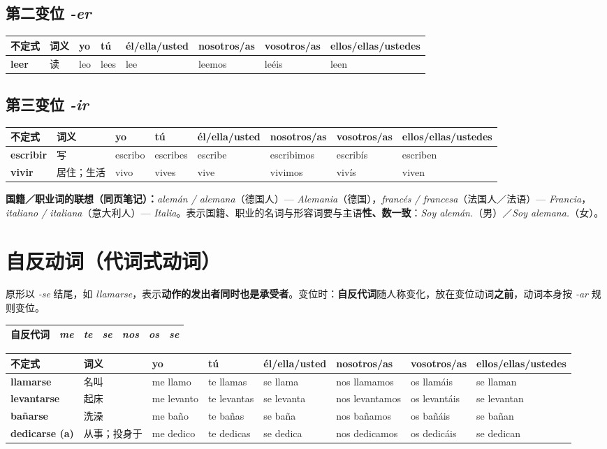 \documentclass[a4paper,11pt]{ctexart}
\makeatletter
\newcommand{\es}[1]{\textit{#1}}
\newcommand{\conj}[8]{\textbf{#1} & {\small #2} & #3 & #4 & #5 & #6 & #7 & #8 \\}
\newenvironment{conjtable}{%
  \par\small\setlength{\tabcolsep}{3.5pt}
  \begin{tabular}{@{}>{\raggedright\arraybackslash}p{1.95cm}>{\raggedright\arraybackslash}p{1.6cm}%
    >{\raggedright\arraybackslash}p{1.75cm}>{\raggedright\arraybackslash}p{1.75cm}>{\raggedright\arraybackslash}p{1.95cm}%
    >{\raggedright\arraybackslash}p{2.15cm}>{\raggedright\arraybackslash}p{1.95cm}>{\raggedright\arraybackslash}p{2.1cm}@{}}
  \toprule
  \textbf{不定式} & \textbf{词义} & \textbf{yo} & \textbf{tú} & \textbf{él/ella/\newline usted} & \textbf{nosotros/as} & \textbf{vosotros/as} & \textbf{ellos/ellas/\newline ustedes} \\
  \midrule
}{%
  \bottomrule\end{tabular}\par\normalsize
}
\makeatother
\begin{document}
\subsection{第二变位 \es{-er}}

\begin{conjtable}
\conj{leer}{读}{leo}{lees}{lee}{leemos}{leéis}{leen}
\end{conjtable}

\subsection{第三变位 \es{-ir}}

\begin{conjtable}
\conj{escribir}{写}{escribo}{escribes}{escribe}{escribimos}{escribís}{escriben}
\conj{vivir}{居住；生活}{vivo}{vives}{vive}{vivimos}{vivís}{viven}
\end{conjtable}

\begin{tip}
\textbf{国籍／职业词的联想（同页笔记）：}\es{alemán / alemana}（德国人）— \es{Alemania}（德国），\es{francés / francesa}（法国人／法语）— \es{Francia}，\es{italiano / italiana}（意大利人）— \es{Italia}。表示国籍、职业的名词与形容词要与主语\textbf{性、数一致}：\es{Soy alemán.}（男）／\es{Soy alemana.}（女）。
\end{tip}

\section{自反动词（代词式动词）}

原形以 \es{-se} 结尾，如 \es{llamarse}，表示\textbf{动作的发出者同时也是承受者}。变位时：\textbf{自反代词}随人称变化，放在变位动词\textbf{之前}，动词本身按 \es{-ar} 规则变位。

\begin{center}
\small
\begin{tabular}{@{}lllllll@{}}
\toprule
自反代词 & \es{me} & \es{te} & \es{se} & \es{nos} & \es{os} & \es{se} \\
\bottomrule
\end{tabular}
\end{center}

\begin{conjtable}
\conj{llamarse}{名叫}{me llamo}{te llamas}{se llama}{nos llamamos}{os llamáis}{se llaman}
\conj{levantarse}{起床}{me levanto}{te levantas}{se levanta}{nos levantamos}{os levantáis}{se levantan}
\conj{bañarse}{洗澡}{me baño}{te bañas}{se baña}{nos bañamos}{os bañáis}{se bañan}
\conj{dedicarse (a)}{从事；投身于}{me dedico}{te dedicas}{se dedica}{nos dedicamos}{os dedicáis}{se dedican}
\end{conjtable}
\end{document}
